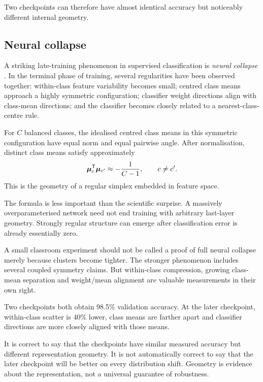 Two checkpoints can therefore have almost identical accuracy but noticeably different internal geometry.

\subsection{Neural collapse}

A striking late-training phenomenon in supervised classification is \emph{neural collapse} \parencite{papyan2020}. In the terminal phase of training, several regularities have been observed together: within-class feature variability becomes small; centred class means approach a highly symmetric configuration; classifier weight directions align with class-mean directions; and the classifier becomes closely related to a nearest-class-centre rule.

For \(C\) balanced classes, the idealised centred class means in this symmetric configuration have equal norm and equal pairwise angle. After normalisation, distinct class means satisfy approximately
\begin{equation}
  \bm{\mu}_c^{\mathsf T}\bm{\mu}_{c'}
  \approx -\frac{1}{C-1},
  \qquad c\neq c'.
  \label{eq:week10-etf}
\end{equation}
This is the geometry of a regular simplex embedded in feature space.

The formula is less important than the scientific surprise. A massively overparameterised network need not end training with arbitrary last-layer geometry. Strongly regular structure can emerge after classification error is already essentially zero.

A small classroom experiment should not be called a proof of full neural collapse merely because clusters become tighter. The stronger phenomenon includes several coupled symmetry claims. But within-class compression, growing class-mean separation and weight/mean alignment are valuable measurements in their own right.

\begin{checkpointbox}
Two checkpoints both obtain 98.5\% validation accuracy. At the later checkpoint, within-class scatter is 40\% lower, class means are farther apart and classifier directions are more closely aligned with those means.

It is correct to say that the checkpoints have similar measured accuracy but different representation geometry. It is not automatically correct to say that the later checkpoint will be better on every distribution shift. Geometry is evidence about the representation, not a universal guarantee of robustness.
\end{checkpointbox}

